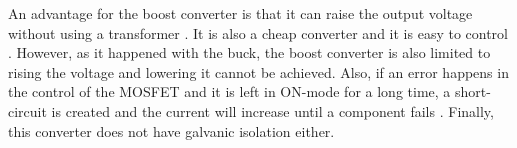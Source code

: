 An advantage for the boost converter is that it can raise the output voltage without using a transformer . It is also a cheap converter and it is easy to control \cite{advantagebuckboost}. 
However, as it happened with the buck, the boost converter is also limited to rising the voltage and lowering it cannot be achieved. Also, if an error happens in the control of the MOSFET and it is left in ON-mode for a long time, a short-circuit is created and the current will increase until a component fails . Finally, this converter does not have galvanic isolation either. 
 

